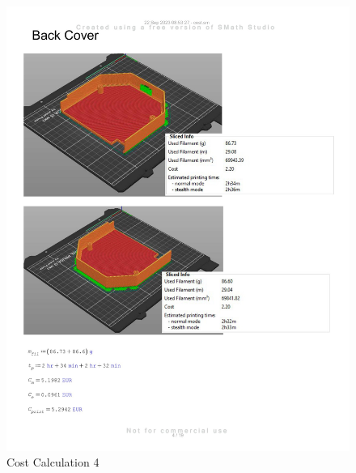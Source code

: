 \begin{figure}[H]
    \centering
    \includegraphics[width=\linewidth]{texs/appendix/data/costcalculation/cost1-04.jpg}
    \caption{Cost Calculation 4}
    \label{fig:cost-calculation-4}
\end{figure}

